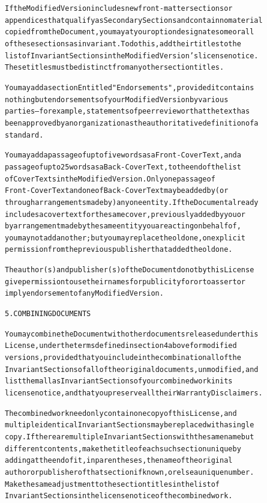 \documentclass[DIV=12,%
               BCOR=0mm,%
               fontsize=10pt,%
               oneside,%
               paper=210mm:11in]{scrbook}
\begin{document}
\begin{alltt}
If the Modified Version includes new front-matter sections or
appendices that qualify as Secondary Sections and contain no material
copied from the Document, you may at your option designate some or all
of these sections as invariant.  To do this, add their titles to the
list of Invariant Sections in the Modified Version's license notice.
These titles must be distinct from any other section titles.

You may add a section Entitled "Endorsements", provided it contains
nothing but endorsements of your Modified Version by various
parties--for example, statements of peer review or that the text has
been approved by an organization as the authoritative definition of a
standard.

You may add a passage of up to five words as a Front-Cover Text, and a
passage of up to 25 words as a Back-Cover Text, to the end of the list
of Cover Texts in the Modified Version.  Only one passage of
Front-Cover Text and one of Back-Cover Text may be added by (or
through arrangements made by) any one entity.  If the Document already
includes a cover text for the same cover, previously added by you or
by arrangement made by the same entity you are acting on behalf of,
you may not add another; but you may replace the old one, on explicit
permission from the previous publisher that added the old one.

The author(s) and publisher(s) of the Document do not by this License
give permission to use their names for publicity for or to assert or
imply endorsement of any Modified Version.


5. COMBINING DOCUMENTS

You may combine the Document with other documents released under this
License, under the terms defined in section 4 above for modified
versions, provided that you include in the combination all of the
Invariant Sections of all of the original documents, unmodified, and
list them all as Invariant Sections of your combined work in its
license notice, and that you preserve all their Warranty Disclaimers.

The combined work need only contain one copy of this License, and
multiple identical Invariant Sections may be replaced with a single
copy.  If there are multiple Invariant Sections with the same name but
different contents, make the title of each such section unique by
adding at the end of it, in parentheses, the name of the original
author or publisher of that section if known, or else a unique number.
Make the same adjustment to the section titles in the list of
Invariant Sections in the license notice of the combined work.


\end{alltt}
\end{document}
